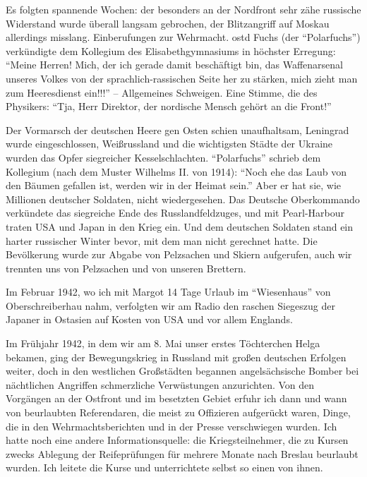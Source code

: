 Es folgten spannende Wochen: der besonders an der Nordfront sehr zähe russische Widerstand wurde überall langsam gebrochen, der Blitzangriff auf Moskau allerdings misslang. Einberufungen zur Wehrmacht. \ac{ostd} Fuchs (der \enquote{Polarfuchs}) verkündigte dem Kollegium des Elisabethgymnasiums in höchster Erregung: \enquote{Meine Herren! Mich, der ich gerade damit beschäftigt bin, das Waffenarsenal unseres Volkes von der sprachlich-rassischen Seite her zu stärken, mich zieht man zum Heeresdienst ein!!!} -- Allgemeines Schweigen. Eine Stimme, die des Physikers: \enquote{Tja, Herr Direktor, der nordische Mensch gehört an die Front!}

 Der Vormarsch der deutschen Heere gen Osten schien unaufhaltsam, Leningrad wurde eingeschlossen, Weißrussland und die wichtigsten Städte der Ukraine wurden das Opfer siegreicher Kesselschlachten. \enquote{Polarfuchs} schrieb dem Kollegium (nach dem Muster Wilhelms II. von 1914): \enquote{Noch ehe das Laub von den Bäumen gefallen ist, werden wir in der Heimat sein.} Aber er hat sie, wie Millionen deutscher Soldaten, nicht wiedergesehen. Das Deutsche Oberkommando verkündete das siegreiche Ende des Russlandfeldzuges, und mit Pearl-Harbour traten USA und Japan in den Krieg ein. Und dem deutschen Soldaten stand ein harter russischer Winter bevor, mit dem man nicht gerechnet hatte. Die Bevölkerung wurde zur Abgabe von Pelzsachen und Skiern aufgerufen, auch wir trennten uns von Pelzsachen und von unseren Brettern.

 Im Februar 1942, wo ich mit Margot 14 Tage Urlaub im \enquote{Wiesenhaus} von Oberschreiberhau nahm, verfolgten wir am Radio den raschen Siegeszug der Japaner in Ostasien auf Kosten von USA und vor allem Englands.

Im Frühjahr 1942, in dem wir am 8. Mai unser erstes Töchterchen Helga bekamen, ging der Bewegungskrieg in Russland mit großen deutschen Erfolgen weiter, doch in den westlichen Großstädten begannen angelsächsische Bomber bei nächtlichen Angriffen schmerzliche Verwüstungen anzurichten. Von den Vorgängen an der Ostfront und im besetzten Gebiet erfuhr ich dann und wann von beurlaubten Referendaren, die meist zu Offizieren aufgerückt waren, Dinge, die in den Wehrmachtsberichten und in der Presse verschwiegen wurden. Ich hatte noch eine andere Informationsquelle: die Kriegsteilnehmer, die zu Kursen zwecks Ablegung der Reifeprüfungen für  mehrere Monate nach Breslau beurlaubt wurden. Ich leitete die Kurse und unterrichtete selbst so einen von ihnen.

